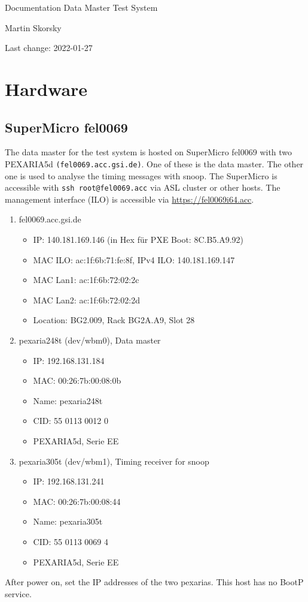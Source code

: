 \documentclass[12pt,a4paper]{report}
\begin{document}
\begin{titlepage}
\vspace{2cm}
\begin{center}
\Huge{Documentation Data Master Test System}

\Large{Martin Skorsky}

\Large{Last change: 2022-01-27}
\end{center}
\vfill
\end{titlepage}

\tableofcontents

\chapter{Hardware}
\section{SuperMicro fel0069}
The data master for the test system is hosted on SuperMicro fel0069 with two PEXARIA5d \texttt{(fel0069.acc.gsi.de)}.
One of these is the data master. The other one is used to analyse the timing messages with snoop.
The SuperMicro is accessible with \texttt{ssh root@fel0069.acc} via ASL cluster or other hosts.
The management interface (ILO) is accessible via \url{https://fel0069i64.acc}.
\begin{enumerate}
\item fel0069.acc.gsi.de
\begin{itemize}
\item IP: 140.181.169.146 (in Hex für PXE Boot: 8C.B5.A9.92)
\item MAC ILO: ac:1f:6b:71:fe:8f, IPv4 ILO: 140.181.169.147
\item MAC Lan1: ac:1f:6b:72:02:2c
\item MAC Lan2: ac:1f:6b:72:02:2d
\item Location: BG2.009, Rack BG2A.A9, Slot 28
\end{itemize}
\item pexaria248t (dev/wbm0), Data master
\begin{itemize}
\item IP: 192.168.131.184
\item MAC: 00:26:7b:00:08:0b
\item Name: pexaria248t
\item CID: 55 0113 0012 0
\item PEXARIA5d, Serie EE
\end{itemize}
\item pexaria305t (dev/wbm1), Timing receiver for snoop
\begin{itemize}
\item IP: 192.168.131.241
\item MAC: 00:26:7b:00:08:44
\item Name: pexaria305t
\item CID: 55 0113 0069 4
\item PEXARIA5d, Serie EE
\end{itemize}
\end{enumerate}
After power on, set the IP addresses of the two pexarias. This host has no BootP service.
\end{document}
